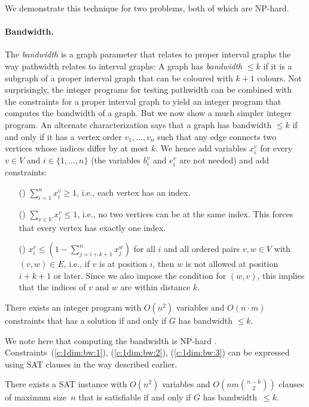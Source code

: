 \documentclass[runningheads]{llncs}
\newcounter{constr}
\newcommand{\constr}[1]{\noindent \refstepcounter{constr}\theconstr #1}
\begin{document}
\iffalse


We demonstrate this technique for two problems, both of which are NP-hard.
\paragraph{Bandwidth.}
The {\em bandwidth} is a graph parameter  that relates to proper
interval graphs the way pathwidth relates to interval graphs:
A graph has {\em bandwidth} $\leq k$ if it is a subgraph of
a proper interval graph that can be coloured with $k+1$ colours.
Not surprisingly, the integer programs for testing
pathwidth can be combined with the constraints for a proper interval
graph to yield an integer program that computes the bandwidth of
a graph.  But we now show a much
simpler integer program.   An alternate
characterization says that a graph has bandwidth $\leq k$ if
and only if it has a vertex order $v_1,\dots,v_n$ such that any
edge connects two vertices whose indices differ by at most $k$.
We hence add variables $x_i^v$ for every $v\in V$ and $i\in \{1,\dots,n\}$
(the variables $b_i^v$ and $e_i^v$ are not needed)
and add constraints:
\begin{itemize}
\item[(\constr{\label{c:1dim:bw:1}})]
 $\sum_{i=1}^n x_i^v \geq 1$, i.e., each vertex has an index.
\item[(\constr{\label{c:1dim:bw:2}})]
 $\sum_{v\in V} x_i^v \leq 1$, i.e., no two vertices can be at
	the same index.  This forces that every vertex has exactly one index.
\item[(\constr{\label{c:1dim:bw:3}})] 
 $x_{i}^v \leq (1-\sum_{j=i+k+1}^n x_{j}^w)$ for all $i$ and
	all ordered pairs $v,w\in V$ with $(v,w)\in E$,
	i.e., if $v$ is at position $i$, then
	$w$ is not allowed at position $i+k+1$ or later.  Since we also
	impose the condition for $(w,v)$, this implies that the indices
	of $v$ and $w$ are within distance $k$.
\end{itemize}

\begin{theorem}
There exists an integer program with $O(n^2)$ variables
and $O(n \cdot m)$ constraints that has a solution if and only if
$G$ has bandwidth $\leq k$.
\end{theorem}
We note here that computing the bandwidth is NP-hard \cite{???}.
Constraints~(\ref{c:1dim:bw:1}), (\ref{c:1dim:bw:2}), (\ref{c:1dim:bw:3})
can be expressed using SAT clauses in the way described earlier.
\begin{theorem}
There exists a SAT instance with $O(n^2)$ variables
and $O(n m \binom{n-k}{2})$ clauses 
of maximum size~$n$ that is satisfiable if and only if
$G$ has bandwidth~$\leq k$.
\label{thm:bw:sat}
\end{theorem} 
\end{document}
